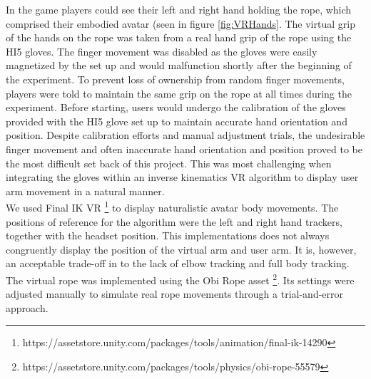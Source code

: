 In the game players could see their left and right hand holding the rope, which comprised their embodied avatar (seen in figure \ref{fig:VRHands}. The virtual grip of the hands on the rope was taken from a real hand grip of the rope using the HI5 gloves. The finger movement was disabled as the gloves were easily magnetized by the set up and would malfunction shortly after the beginning of the experiment. To prevent loss of ownership from random finger movements, players were told to maintain the same grip on the rope at all times during the experiment. Before starting, users would undergo the calibration of the gloves provided with the HI5 glove set up to maintain accurate hand orientation and position. Despite calibration efforts and manual adjustment trials, the  undesirable finger movement and often inaccurate hand orientation and position proved to be the most difficult set back of this project. This was most challenging when integrating the gloves within an inverse kinematics VR algorithm to display user arm movement in a natural manner.
\\
We used Final IK VR \footnote{https://assetstore.unity.com/packages/tools/animation/final-ik-14290} to display naturalistic avatar body movements. The positions of reference for the algorithm were the left and right hand trackers, together with the headset position. 
This implementations does not always congruently display the position of the virtual arm and user arm. It is, however, an acceptable trade-off in to the lack of elbow tracking and full body tracking. 
The virtual rope was implemented using the Obi Rope asset \footnote{https://assetstore.unity.com/packages/tools/physics/obi-rope-55579}. Its settings were adjusted manually to simulate real rope movements through a trial-and-error approach.

